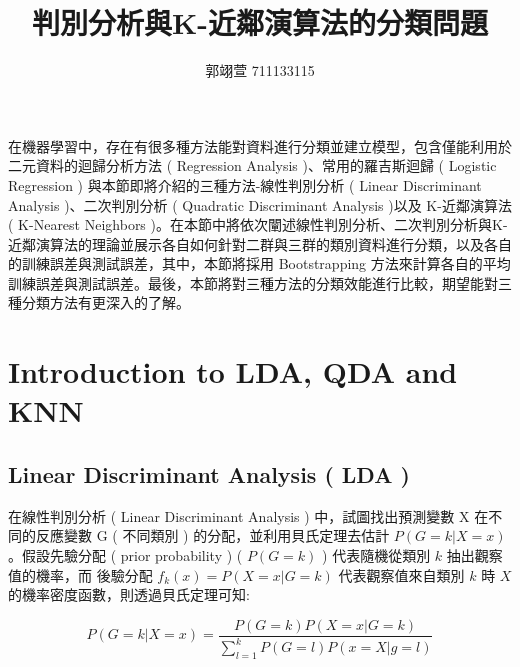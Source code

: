 \geometry{a4paper,left=2.5cm,right=2.5cm,top=2cm,bottom=2cm}
\usepackage{fancyhdr}
\pagestyle{fancy}


\title{{\MB 判別分析與K-近鄰演算法的分類問題}}	
\author{{\BB 郭翊萱 711133115}}				
\date{{ }} 			
 

\maketitle
\fontsize{12}{22pt}\selectfont 

在機器學習中，存在有很多種方法能對資料進行分類並建立模型，包含僅能利用於二元資料的迴歸分析方法 ( Regression Analysis )、常用的羅吉斯迴歸 ( Logistic Regression ) 與本節即將介紹的三種方法-線性判別分析 ( Linear Discriminant Analysis )、二次判別分析 ( Quadratic Discriminant Analysis )以及 K-近鄰演算法 ( K-Nearest Neighbors )。在本節中將依次闡述線性判別分析、二次判別分析與K-近鄰演算法的理論並展示各自如何針對二群與三群的類別資料進行分類，以及各自的訓練誤差與測試誤差，其中，本節將採用 Bootstrapping 方法來計算各自的平均訓練誤差與測試誤差。最後，本節將對三種方法的分類效能進行比較，期望能對三種分類方法有更深入的了解。

\section{Introduction to LDA, QDA and KNN}

\subsection{Linear Discriminant Analysis ( LDA )}

在線性判別分析 ( Linear Discriminant Analysis ) 中，試圖找出預測變數 X 在不同的反應變數 G ( 不同類別 ) 的分配，並利用貝氏定理去估計 $P(G=k|X=x)$。假設先驗分配 ( prior probability ) ( $P(G=k)$ ) 代表隨機從類別 $k$ 抽出觀察值的機率，而 後驗分配 $f_k(x)=P(X=x|G=k)$ 代表觀察值來自類別 $k$ 時 $X$ 的機率密度函數，則透過貝氏定理可知:

\begin{equation}
P(G=k|X=x)=\frac{P(G=k)P(X=x|G=k)}{\sum_{l=1}^{k}P(G=l)P(x=X|g=l)}
\end{equation}

